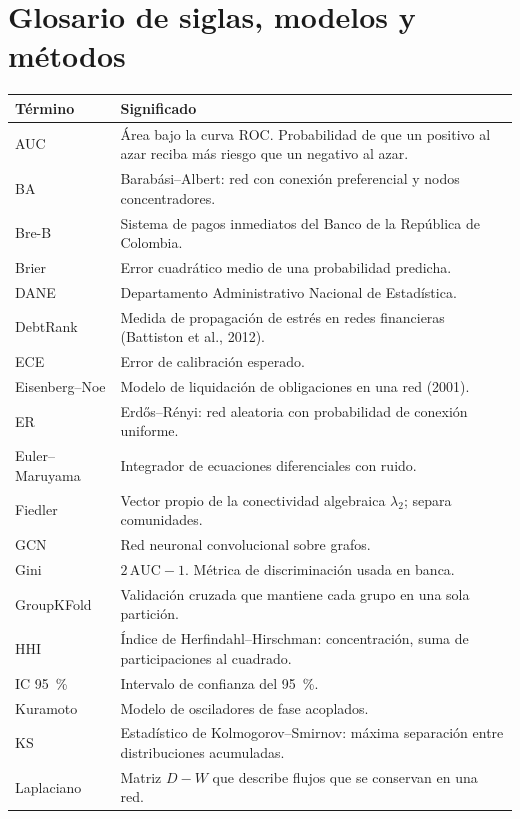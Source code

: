 \section{Glosario de siglas, modelos y métodos}

\begin{longtable}{p{}p{}}
\toprule
\textbf{Término} & \textbf{Significado} \\
\midrule
\endhead
AUC & Área bajo la curva ROC. Probabilidad de que un positivo al azar reciba más riesgo
que un negativo al azar. \\
BA & Barabási–Albert: red con conexión preferencial y nodos concentradores. \\
Bre-B & Sistema de pagos inmediatos del Banco de la República de Colombia. \\
Brier & Error cuadrático medio de una probabilidad predicha. \\
DANE & Departamento Administrativo Nacional de Estadística. \\
DebtRank & Medida de propagación de estrés en redes financieras (Battiston et al.,
2012). \\
ECE & Error de calibración esperado. \\
Eisenberg–Noe & Modelo de liquidación de obligaciones en una red (2001). \\
ER & Erdős–Rényi: red aleatoria con probabilidad de conexión uniforme. \\
Euler–Maruyama & Integrador de ecuaciones diferenciales con ruido. \\
Fiedler & Vector propio de la conectividad algebraica $\lambda_2$; separa comunidades. \\
GCN & Red neuronal convolucional sobre grafos. \\
Gini & $2\,\mathrm{AUC}-1$. Métrica de discriminación usada en banca. \\
GroupKFold & Validación cruzada que mantiene cada grupo en una sola partición. \\
HHI & Índice de Herfindahl–Hirschman: concentración, suma de participaciones al
cuadrado. \\
IC 95~\% & Intervalo de confianza del 95~\%. \\
Kuramoto & Modelo de osciladores de fase acoplados. \\
KS & Estadístico de Kolmogorov–Smirnov: máxima separación entre distribuciones
acumuladas. \\
Laplaciano & Matriz $D-W$ que describe flujos que se conservan en una red. \\

\end{longtable}
